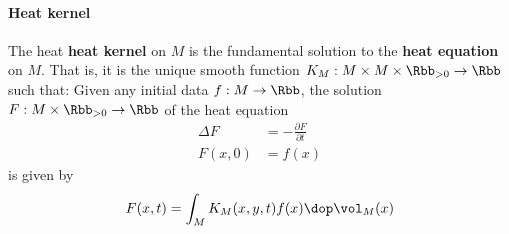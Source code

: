 
\newpage
\paragraph{Heat kernel}
The heat \textbf{heat kernel} on $M$ is the fundamental solution to the \textbf{heat equation} on $M$. That is,  it is the unique smooth function $K_M:M\times M \times \Rbb_{>0} \to \Rbb$ such that:  Given any initial data $f: M \to \Rbb$, the solution $F:M\times \Rbb_{>0} \to \Rbb$ of the heat equation
\begin{align}
  \Delta F & = - \frac{\partial F}{\partial t} \\
  F(x,0)   & = f(x)
\end{align}
is given by
\begin{align}
  F(x,t) = \int_M K_M(x,y,t)f(x) \dop \vol_M(x)
\end{align}


